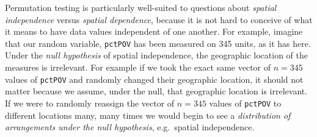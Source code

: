 \documentclass[
]{book}
\newcommand{\passthrough}[1]{#1}
\begin{document}
Permutation testing is particularly well-suited to questions about \emph{spatial independence} versus \emph{spatial dependence}, because it is not hard to conceive of what it means to have data values independent of one another. For example, imagine that our random variable, \passthrough{\lstinline!pctPOV!} has been measured on 345 units, as it has here. Under the \emph{null hypothesis} of spatial independence, the geographic location of the measures is irrelevant. For example if we took the exact same vector of \(n=345\) values of \passthrough{\lstinline!pctPOV!} and randomly changed their geographic location, it should not matter because we assume, under the null, that geographic location is irrelevant. If we were to randomly reassign the vector of \(n=345\) values of \passthrough{\lstinline!pctPOV!} to different locations many, many times we would begin to see a \emph{distribution of arrangements under the null hypothesis}, e.g.~spatial independence.
\end{document}
